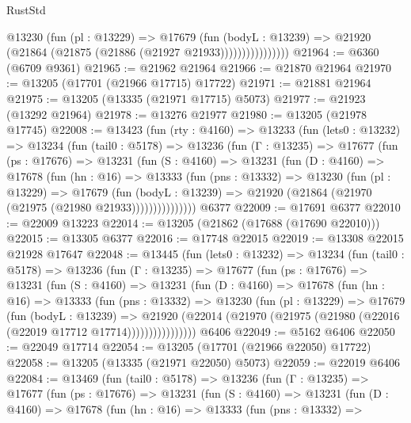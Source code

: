 \begin{lexlean}{RustStd}
\begin{coremodule}
                      @13230
                        (fun (pl : @13229) =>
                        @17679
                          (fun (bodyL : @13239) =>
                          @21920 (@21864 (@21875 (@21886 (@21927 @21933))))))))))))))))
@21964 := @6360 (@6709 @9361)
@21965 := @21962 @21964
@21966 := @21870 @21964
@21970 := @13205 (@17701 (@21966 @17715) @17722)
@21971 := @21881 @21964
@21975 := @13205 (@13335 (@21971 @17715) @5073)
@21977 := @21923 (@13292 @21964)
@21978 := @13276 @21977
@21980 := @13205 (@21978 @17745)
@22008 := @13423
    (fun (rty : @4160) =>
    @13233
      (fun (lets0 : @13232) =>
      @13234
        (fun (tail0 : @5178) =>
        @13236
          (fun (Γ : @13235) =>
          @17677
            (fun (ps : @17676) =>
            @13231
              (fun (S : @4160) =>
              @13231
                (fun (D : @4160) =>
                @17678
                  (fun (hn : @16) =>
                  @13333
                    (fun (pns : @13332) =>
                    @13230
                      (fun (pl : @13229) =>
                      @17679
                        (fun (bodyL : @13239) =>
                        @21920 (@21864 (@21970 (@21975 (@21980 @21933)))))))))))))))
    @6377
@22009 := @17691 @6377
@22010 := @22009 @13223
@22014 := @13205 (@21862 (@17688 (@17690 @22010)))
@22015 := @13305 @6377
@22016 := @17748 @22015
@22019 := @13308 @22015 @21928 @17647
@22048 := @13445
    (fun (lets0 : @13232) =>
    @13234
      (fun (tail0 : @5178) =>
      @13236
        (fun (Γ : @13235) =>
        @17677
          (fun (ps : @17676) =>
          @13231
            (fun (S : @4160) =>
            @13231
              (fun (D : @4160) =>
              @17678
                (fun (hn : @16) =>
                @13333
                  (fun (pns : @13332) =>
                  @13230
                    (fun (pl : @13229) =>
                    @17679
                      (fun (bodyL : @13239) =>
                      @21920
                        (@22014
                          (@21970 (@21975 (@21980 (@22016 (@22019 @17712 @17714))))))))))))))))
    @6406
@22049 := @5162 @6406
@22050 := @22049 @17714
@22054 := @13205 (@17701 (@21966 @22050) @17722)
@22058 := @13205 (@13335 (@21971 @22050) @5073)
@22059 := @22019 @6406
@22084 := @13469
    (fun (tail0 : @5178) =>
    @13236
      (fun (Γ : @13235) =>
      @17677
        (fun (ps : @17676) =>
        @13231
          (fun (S : @4160) =>
          @13231
            (fun (D : @4160) =>
            @17678
              (fun (hn : @16) =>
              @13333
                (fun (pns : @13332) =>

\end{coremodule}
\end{lexlean}
